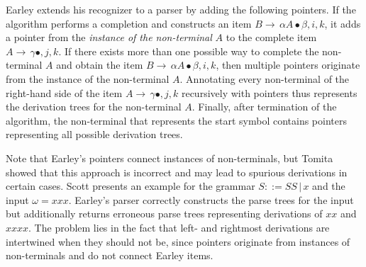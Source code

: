 \begin{isabellebody}
\begin{isamarkuptext}
Earley \cite{Earley:1970} extends his recognizer to a parser by adding the following
pointers. If the algorithm performs a completion and constructs an item $B \rightarrow \, \alpha A \bullet \beta, i, k$,
it adds a pointer from the \textit{instance of the non-terminal} $A$ to the complete item
$A \rightarrow \, \gamma \bullet, j, k$. If there exists more than one possible way to complete the non-terminal
$A$ and obtain the item $B \rightarrow \, \alpha A \bullet \beta, i, k$, then multiple pointers originate
from the instance of the non-terminal $A$. Annotating every non-terminal of the right-hand side of the item
$A \rightarrow \, \gamma \bullet, j, k$ recursively with pointers thus represents the derivation trees for
the non-terminal $A$. Finally, after termination of the algorithm, the non-terminal that represents the start symbol
contains pointers representing all possible derivation trees.

Note that Earley's pointers connect instances of non-terminals, but Tomita \cite{Tomita:1985} showed
that this approach is incorrect and may lead to spurious derivations in certain cases. Scott \cite{Scott:2008}
presents an example for the grammar $S ::= SS \, | \, x$ and the input $\omega = xxx$. Earley's parser
correctly constructs the parse trees for the input but additionally returns erroneous parse trees representing
derivations of $xx$ and $xxxx$. The problem lies in the fact that left- and rightmost derivations are
intertwined when they should not be, since pointers originate from instances of non-terminals and do not
connect Earley items.


\end{isamarkuptext}
\end{isabellebody}
